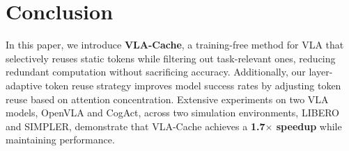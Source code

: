 \section{Conclusion} 
\label{sec:conclusion}
In this paper, we introduce \textbf{VLA-Cache}, a training-free method for VLA that selectively reuses static tokens while filtering out task-relevant ones, reducing redundant computation without sacrificing accuracy. Additionally, our layer-adaptive token reuse strategy improves model success rates by adjusting token reuse based on attention concentration. Extensive experiments on two VLA models, OpenVLA and CogAct, across two simulation environments, LIBERO and SIMPLER, demonstrate that VLA-Cache achieves a \textbf{1.7$\times$ speedup} while maintaining performance. 
